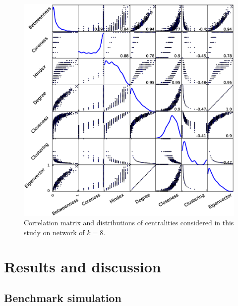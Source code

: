 \documentclass[preprint,12pt,3p]{elsarticle}
\begin{document}
\begin{figure}
  \centering
  \includegraphics[width=16cm]{Powerlaw_k8_centrality_correlation.eps}
  \caption{Correlation matrix and distributions of centralities considered in this study on network of $k=8$.
  }
  \label{fig corr centrality k=8}
\end{figure}



\section{ Results and discussion}

\subsection{Benchmark simulation}
\end{document}
